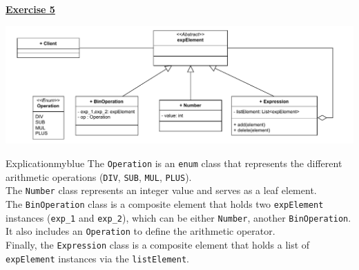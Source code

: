 \newpage
\begin{center}
    \Huge{\textbf{\underline{Exercise 5}}}
\end{center}

\vspace{0.45cm}

\begin{center}
    \includegraphics[height=0.22\textheight]{Exercices/EX5/ex5.drawio.pdf}
\end{center}

\vspace{0.25cm}


\begin{prettyBox}{Explication}{myblue}
The \texttt{Operation} is an \texttt{enum} class that represents the different arithmetic operations 
(\texttt{DIV}, \texttt{SUB}, \texttt{MUL}, \texttt{PLUS}).\\[0.15cm]
The \texttt{Number} class represents an integer value and serves as a leaf element.\\[0.15cm]
The \texttt{BinOperation} class is a composite element that holds two \texttt{expElement} instances 
(\texttt{exp\_1} and \texttt{exp\_2}), which can be either \texttt{Number}, another \texttt{BinOperation}. It also includes an \texttt{Operation} to define the arithmetic operator.\\[0.15cm]
Finally, the \texttt{Expression} class is a composite element that holds a list of \texttt{expElement} instances 
via the \texttt{listElement}. 
\end{prettyBox}

